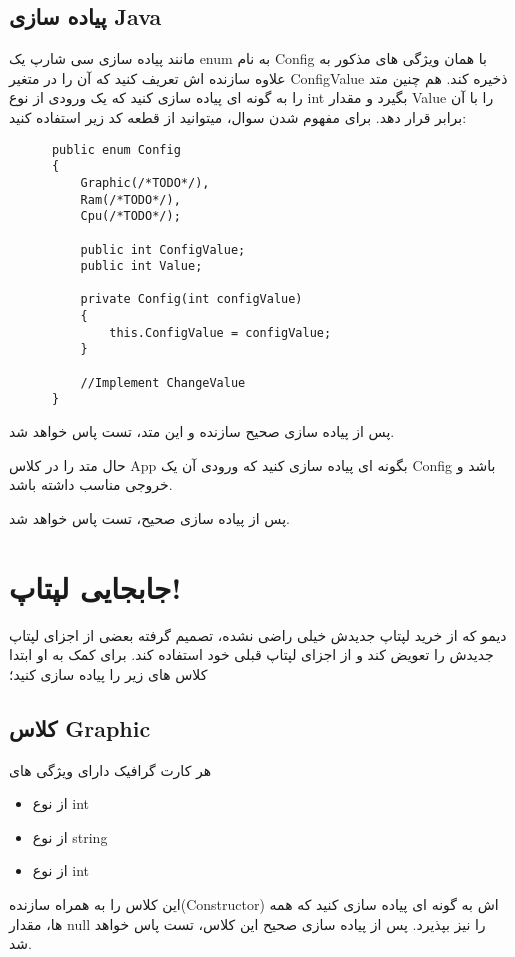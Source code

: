     \subsection{پیاده سازی Java}
    مانند پیاده سازی سی شارپ 
    یک enum به نام Config با همان ویژگی های مذکور به علاوه سازنده اش تعریف کنید که آن را در متغیر 
    ConfigValue
    ذخیره کند.
    هم چنین متد 
    \grayBox{\textcolor{blue}{ChangeValue}}
    را به گونه ای پیاده سازی کنید که یک ورودی از نوع 
    int
    بگیرد و مقدار Value 
    را با آن برابر قرار دهد.
    برای مفهوم شدن سوال، میتوانید از قطعه کد زیر استفاده کنید:
    \LTR
    \begin{lstlisting}
      public enum Config 
      {
          Graphic(/*TODO*/),
          Ram(/*TODO*/),
          Cpu(/*TODO*/);
            
          public int ConfigValue;
          public int Value;
            
          private Config(int configValue)
          {
              this.ConfigValue = configValue;
          }
    
          //Implement ChangeValue
      }

    \end{lstlisting}
    \RTL
    پس از پیاده سازی صحیح سازنده و این متد، تست 
     \grayBox{\textcolor{dkgreen}{Config\_Test}}
     پاس خواهد شد.
    
    حال متد 
    \grayBox{\textcolor{blue}{ChooseBest}}
    را در کلاس 
    App
    بگونه ای پیاده سازی کنید  
    که ورودی آن یک 
    Config 
    باشد و خروجی مناسب داشته باشد. 
    
    
    پس از پیاده سازی صحیح، تست 
    \grayBox{\textcolor{dkgreen}{ChooseBest\_Test}}
    پاس خواهد شد.
    \section{جابجایی لپتاپ!}
    دیمو که از خرید لپتاپ جدیدش خیلی راضی نشده، تصمیم گرفته بعضی از اجزای لپتاپ جدیدش را تعویض کند و از اجزای لپتاپ قبلی خود استفاده کند.
    برای کمک به او ابتدا کلاس های زیر را پیاده سازی کنید؛
    \subsection{
    کلاس Graphic
    \grayBox{\textcolor{purple}{C\#}}
    }
    هر کارت گرافیک دارای ویژگی های 
    \begin{itemize}
        \item 
             از نوع 
            int 
        \item
            
            از نوع
            string
        \item
        
            از نوع 
            int 
    \end{itemize}
    این کلاس را به همراه سازنده(Constructor) اش به گونه ای پیاده سازی کنید که همه 
    ها، مقدار null را نیز بپذیرد.
    پس از پیاده سازی صحیح این کلاس،
    تست
    \grayBox{\textcolor{dkgreen}{GraphicConstructor\_Tests}}
    پاس خواهد شد.
    

